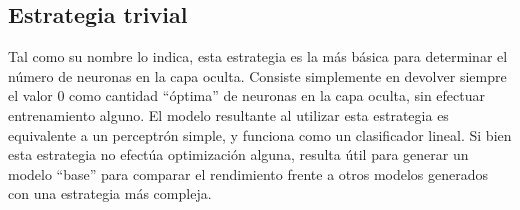 %
\subsection{Estrategia trivial}
%
Tal como su nombre lo indica, esta estrategia es la más básica para
determinar el número de neuronas en la capa oculta.
Consiste simplemente en devolver siempre el valor $0$ como cantidad
``óptima'' de neuronas en la capa oculta, sin efectuar entrenamiento
alguno.
El modelo resultante al utilizar esta estrategia es equivalente a un
perceptrón simple, y funciona como un clasificador lineal.
Si bien esta estrategia no efectúa optimización alguna, resulta útil
para generar un modelo ``base'' para comparar el rendimiento frente a
otros modelos generados con una estrategia más compleja.
